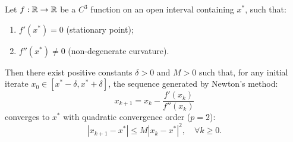 \begin{theorem}
\label{thm:newton-quadratic-convergence-proof-en}
Let $f: \mathbb{R} \to \mathbb{R}$ be a $C^3$ function on an open interval containing $x^*$, such that:
\begin{enumerate}
    \item $f'(x^*) = 0$ (stationary point);
    \item $f''(x^*) \ne 0$ (non-degenerate curvature).
\end{enumerate}
Then there exist positive constants $\delta > 0$ and $M > 0$ such that, for any initial iterate $x_0 \in [x^* - \delta, x^* + \delta]$, the sequence generated by Newton's method:
\begin{equation}
    x_{k+1} = x_k - \frac{f'(x_k)}{f''(x_k)}
\end{equation}
converges to $x^*$ with quadratic convergence order ($p = 2$):
\begin{equation}
    |x_{k+1} - x^*| \le M |x_k - x^*|^2, \quad \forall k \ge 0.
    \label{eq:newton-quadratic-bound-en}
\end{equation}
\end{theorem}

